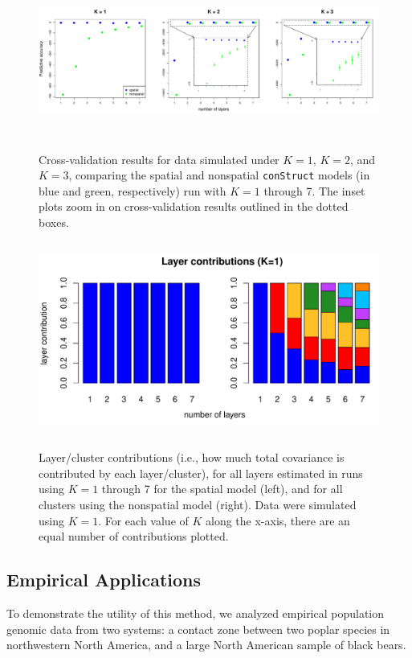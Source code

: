 \documentclass[10pt,letterpaper]{article}
\begin{document}
\begin{figure}
	\centering
		{\includegraphics[width=6in,height=2in]{figs/sims/sim_xvals.pdf}}
	\caption{
	Cross-validation results for data simulated under $K=1$, $K=2$, and $K=3$, 
	comparing the spatial and nonspatial \texttt{conStruct} models 
	(in blue and green, respectively) run with $K=1$ through 7.  
	The inset plots zoom in on cross-validation results outlined in the dotted boxes.
    }\label{sim_xvals}
\end{figure}

\begin{figure}
	\centering
		{\includegraphics[width=5in,height=2.5in]{figs/sims/simK1_laycon_barplots.pdf}}
		\caption{
			Layer/cluster contributions (i.e., how much total covariance is contributed by each layer/cluster), 
			for all layers estimated in runs using $K = 1$ through 7 
			for the spatial model (left),
			and for all clusters using the nonspatial model (right).
			Data were simulated using $K=1$.
			For each value of $K$ along the x-axis, there are an equal number of contributions plotted.
		}\label{simK1_laycon}
\end{figure}


\subsection*{Empirical Applications}

To demonstrate the utility of this method, we analyzed empirical population genomic data from two systems:
a contact zone between two poplar species in northwestern North America,
and a large North American sample of black bears.
\end{document}
